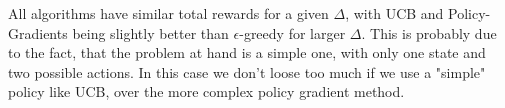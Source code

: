 \documentclass[a4paper, 11pt]{article} %
\begin{document}
All algorithms have similar total rewards for a given $\Delta$, with UCB and Policy-Gradients being slightly better than $\epsilon$-greedy for larger $\Delta$. This is probably due to the fact, that the problem at hand is a simple one, with only one state and two possible actions. In this case we don't loose too much if we use a "simple" policy like UCB, over the more complex policy gradient method.
\end{document}
